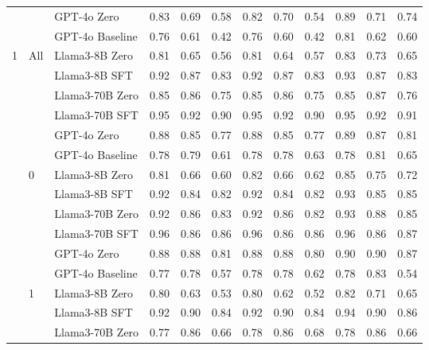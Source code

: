 \begin{longtable}[t]{ll>{}l|rr>{}r|rr>{}r|rrr}
 &  & GPT-4o Zero & 0.83 & 0.69 & 0.58 & 0.82 & 0.70 & 0.54 & 0.89 & 0.71 & 0.74\\

 &  & GPT-4o Baseline & 0.76 & 0.61 & 0.42 & 0.76 & 0.60 & 0.42 & 0.81 & 0.62 & 0.60\\
\cmidrule{1-12}
1 & All & Llama3-8B Zero & 0.81 & 0.65 & 0.56 & 0.81 & 0.64 & 0.57 & 0.83 & 0.73 & 0.65\\

 &  & Llama3-8B SFT & 0.92 & 0.87 & 0.83 & 0.92 & 0.87 & 0.83 & 0.93 & 0.87 & 0.83\\

 &  & Llama3-70B Zero & 0.85 & 0.86 & 0.75 & 0.85 & 0.86 & 0.75 & 0.85 & 0.87 & 0.76\\

 &  & Llama3-70B SFT & 0.95 & 0.92 & 0.90 & 0.95 & 0.92 & 0.90 & 0.95 & 0.92 & 0.91\\

 &  & GPT-4o Zero & 0.88 & 0.85 & 0.77 & 0.88 & 0.85 & 0.77 & 0.89 & 0.87 & 0.81\\

 &  & GPT-4o Baseline & 0.78 & 0.79 & 0.61 & 0.78 & 0.78 & 0.63 & 0.78 & 0.81 & 0.65\\
\cmidrule{2-12}
 & 0 & Llama3-8B Zero & 0.81 & 0.66 & 0.60 & 0.82 & 0.66 & 0.62 & 0.85 & 0.75 & 0.72\\

 &  & Llama3-8B SFT & 0.92 & 0.84 & 0.82 & 0.92 & 0.84 & 0.82 & 0.93 & 0.85 & 0.85\\

 &  & Llama3-70B Zero & 0.92 & 0.86 & 0.83 & 0.92 & 0.86 & 0.82 & 0.93 & 0.88 & 0.85\\

 &  & Llama3-70B SFT & 0.96 & 0.86 & 0.86 & 0.96 & 0.86 & 0.86 & 0.96 & 0.86 & 0.87\\

 &  & GPT-4o Zero & 0.88 & 0.88 & 0.81 & 0.88 & 0.88 & 0.80 & 0.90 & 0.90 & 0.87\\

 &  & GPT-4o Baseline & 0.77 & 0.78 & 0.57 & 0.78 & 0.78 & 0.62 & 0.78 & 0.83 & 0.54\\
\cmidrule{2-12}
 & 1 & Llama3-8B Zero & 0.80 & 0.63 & 0.53 & 0.80 & 0.62 & 0.52 & 0.82 & 0.71 & 0.65\\

 &  & Llama3-8B SFT & 0.92 & 0.90 & 0.84 & 0.92 & 0.90 & 0.84 & 0.94 & 0.90 & 0.86\\

 &  & Llama3-70B Zero & 0.77 & 0.86 & 0.66 & 0.78 & 0.86 & 0.68 & 0.78 & 0.86 & 0.66\\


\end{longtable}
